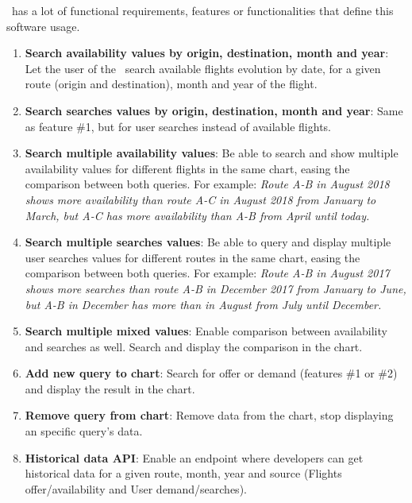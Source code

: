 \thesis\ has a lot of functional requirements, features or functionalities that define this software usage. 

\begin{enumerate}
    \item \textbf{Search availability values by origin, destination, month and year}: Let the user of the \thesis\ search available flights evolution by date, for a given route (origin and destination), month and year of the flight.
    \\
    \item \textbf{Search searches values by origin, destination, month and year}: Same as feature \#1, but for user searches instead of available flights.
    \\
    \item \textbf{Search multiple availability values}: Be able to search and show multiple availability values for different flights in the same chart, easing the comparison between both queries. For example: \textit{Route A-B in August 2018 shows more availability than route A-C in August 2018 from January to March, but A-C has more availability than A-B from April until today.}
    \\
    \item \textbf{Search multiple searches values}: Be able to query and display multiple user searches values for different routes in the same chart, easing the comparison between both queries. For example: \textit{Route A-B in August 2017 shows more searches than route A-B in December 2017 from January to June, but A-B in December has more than in August from July until December.}
    \\
    \item \textbf{Search multiple mixed values}: Enable comparison between availability and searches as well. Search and display the comparison in the chart.
    \\
    \item \textbf{Add new query to chart}: Search for offer or demand (features \#1 or \#2) and display the result in the chart.
    \\
    \item \textbf{Remove query from chart}: Remove data from the chart, stop displaying an specific query's data.
    \\
    \item \textbf{Historical data API}: Enable an endpoint where developers can get historical data for a given route, month, year and source (Flights offer/availability and User demand/searches).
\end{enumerate}

